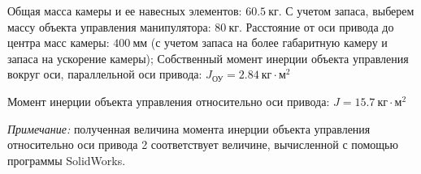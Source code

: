 Общая масса камеры и ее навесных элементов: $60.5 ~\text{кг}$. С учетом запаса, выберем
массу объекта управления манипулятора: $80 ~\text{кг}$.
Расстояние от оси привода до центра масс камеры: $400 ~\text{мм}$ (с учетом запаса
на более габаритную камеру и запаса на ускорение камеры);
Собственный момент инерции объекта управления вокруг оси, параллельной оси привода:
$ J_{\text{ОУ}} = 2.84 ~\text{кг} \cdot \text{м}^2 $

Момент инерции объекта управления относительно оси привода:
$ J = 15.7 ~\text{кг} \cdot \text{м}^2 $

\textit{Примечание:} полученная величина момента инерции объекта управления относительно оси привода 2 соответствует величине, вычисленной с помощью программы SolidWorks.



\endinput

